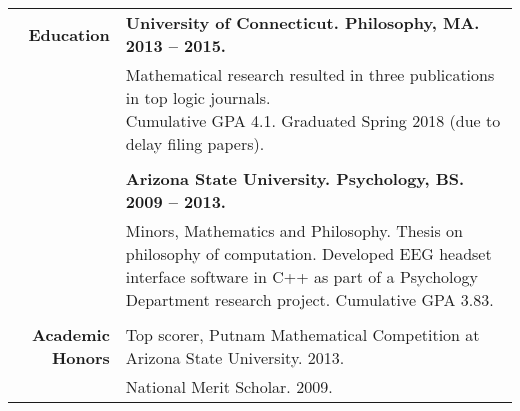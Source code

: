 \documentclass{article}
\begin{document}
\begin{tabular}{rl}
  {\bf Education} & {\bf University of Connecticut. Philosophy, MA. 2013 -- 2015.} \\
  & \parbox{4.5in}{Mathematical research resulted in three publications in top logic journals. \\ Cumulative GPA 4.1. Graduated Spring 2018 (due to delay filing papers).} \\ \\

  & {\bf Arizona State University. Psychology, BS. 2009 -- 2013.} \\
  & \parbox{4.5in}{Minors, Mathematics and Philosophy. Thesis on philosophy of computation. Developed EEG headset interface software in C++ as part of a Psychology Department research project. Cumulative GPA 3.83.} \\ \\



  {\bf Academic Honors} & Top scorer, Putnam Mathematical Competition at Arizona State University. 2013. \\
   & National Merit Scholar. 2009.
\end{tabular}
\egroup
\end{document}
